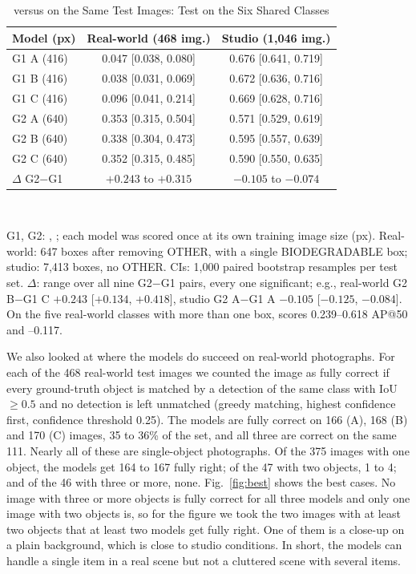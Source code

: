\begin{table}[!t]
\centering
\caption{\genone versus \gentwo on the Same Test Images: Test \mapfifty [95\% CI] on the Six Shared Classes}
\label{tab:g1g2}
\footnotesize
\begin{tabular}{@{}lcc@{}}
\toprule
Model (px) & Real-world (468 img.) & Studio (1,046 img.) \\
\midrule
G1 A (416) & 0.047 [0.038, 0.080] & 0.676 [0.641, 0.719] \\
G1 B (416) & 0.038 [0.031, 0.069] & 0.672 [0.636, 0.716] \\
G1 C (416) & 0.096 [0.041, 0.214] & 0.669 [0.628, 0.716] \\
\midrule
G2 A (640) & 0.353 [0.315, 0.504] & 0.571 [0.529, 0.619] \\
G2 B (640) & 0.338 [0.304, 0.473] & 0.595 [0.557, 0.639] \\
G2 C (640) & 0.352 [0.315, 0.485] & 0.590 [0.550, 0.635] \\
\midrule
$\Delta$ G2$-$G1 & $+0.243$ to $+0.315$ & $-0.105$ to $-0.074$ \\
\bottomrule
\end{tabular}
\\[2pt]
\parbox{\columnwidth}{\footnotesize G1, G2: \genone, \gentwo; each model was scored once at its own training image size (px). Real-world: 647 boxes after removing OTHER, with a single BIODEGRADABLE box; studio: 7,413 boxes, no OTHER. CIs: 1,000 paired bootstrap resamples per test set. $\Delta$: range over all nine G2$-$G1 pairs, every one significant; e.g., real-world G2 B$-$G1 C $+0.243$ [$+0.134$, $+0.418$], studio G2 A$-$G1 A $-0.105$ [$-0.125$, $-0.084$]. On the five real-world classes with more than one box, \gentwo scores 0.239--0.618 AP@50 and --0.117.}
\end{table}

We also looked at where the \gentwo models do succeed on real-world photographs. For each of the 468 real-world test images we counted the image as fully correct if every ground-truth object is matched by a detection of the same class with IoU $\geq 0.5$ and no detection is left unmatched (greedy matching, highest confidence first, confidence threshold 0.25). The models are fully correct on 166 (A), 168 (B) and 170 (C) images, 35 to 36\% of the set, and all three are correct on the same 111. Nearly all of these are single-object photographs. Of the 375 images with one object, the models get 164 to 167 fully right; of the 47 with two objects, 1 to 4; and of the 46 with three or more, none. Fig.~\ref{fig:best} shows the best cases. No image with three or more objects is fully correct for all three models and only one image with two objects is, so for the figure we took the two images with at least two objects that at least two models get fully right. One of them is a close-up on a plain background, which is close to studio conditions. In short, the models can handle a single item in a real scene but not a cluttered scene with several items.

